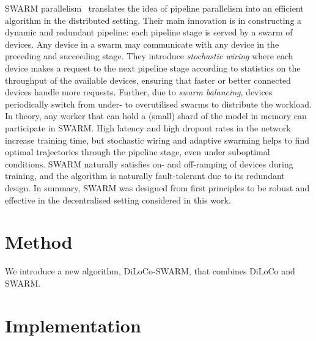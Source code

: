 \documentclass[conference, 10pt]{IEEEtran}
\begin{document}
SWARM parallelism~\cite{ryabinin2023} translates the idea of pipeline
parallelism into an efficient algorithm in the distributed setting. Their main
innovation is in constructing a dynamic and redundant pipeline: each pipeline
stage is served by a swarm of devices. Any device in a swarm may communicate
with any device in the preceding and succeeding stage. They introduce
\textit{stochastic wiring} where each device makes a request to the next
pipeline stage according to statistics on the throughput of the available
devices, ensuring that faster or better connected devices handle more requests.
Further, due to \textit{swarm balancing}, devices periodically switch from
under- to overutilised swarms to distribute the workload. In theory, any worker
that can hold a (small) shard of the model in memory can participate in SWARM. 
High latency and high dropout rates in the network increase training time, but 
stochastic wiring and adaptive swarming helps to find optimal trajectories
through the pipeline stage, even under suboptimal conditions. SWARM naturally
satisfies on- and off-ramping of devices during training, and the algorithm is
naturally fault-tolerant due to its redundant design. In summary, SWARM was
designed from first principles to be robust and effective in the decentralised
setting considered in this work.

% 

\section{Method}
\label{sec:method}

We introduce a new algorithm, DiLoCo-SWARM, that combines DiLoCo and SWARM.


\section{Implementation}
\label{sec:implementation}
\end{document}
